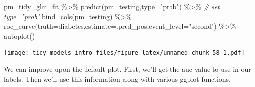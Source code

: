 \documentclass[
]{article}
\newenvironment{Shaded}{\begin{snugshade}}{\end{snugshade}}
\newcommand{\AttributeTok}[1]{\textcolor[rgb]{0.77,0.63,0.00}{#1}}
\newcommand{\CommentTok}[1]{\textcolor[rgb]{0.56,0.35,0.01}{\textit{#1}}}
\newcommand{\FunctionTok}[1]{\textcolor[rgb]{0.00,0.00,0.00}{#1}}
\newcommand{\NormalTok}[1]{#1}
\newcommand{\SpecialCharTok}[1]{\textcolor[rgb]{0.00,0.00,0.00}{#1}}
\newcommand{\StringTok}[1]{\textcolor[rgb]{0.31,0.60,0.02}{#1}}
\begin{document}
\begin{Shaded}
\begin{Highlighting}[]
\NormalTok{pm\_tidy\_glm\_fit }\SpecialCharTok{\%\textgreater{}\%}
  \FunctionTok{predict}\NormalTok{(pm\_testing,}\AttributeTok{type=}\StringTok{"prob"}\NormalTok{) }\SpecialCharTok{\%\textgreater{}\%}      \CommentTok{\# set type="prob"}
  \FunctionTok{bind\_cols}\NormalTok{(pm\_testing) }\SpecialCharTok{\%\textgreater{}\%}
  \FunctionTok{roc\_curve}\NormalTok{(}\AttributeTok{truth=}\NormalTok{diabetes,}\AttributeTok{estimate=}\NormalTok{.pred\_pos,}\AttributeTok{event\_level=}\StringTok{"second"}\NormalTok{) }\SpecialCharTok{\%\textgreater{}\%}
  \FunctionTok{autoplot}\NormalTok{()}
\end{Highlighting}
\end{Shaded}

\texttt{[image: tidy\_models\_intro\_files/figure-latex/unnamed-chunk-58-1.pdf]}

We can improve upon the default plot. First, we'll get the auc value to
use in our labels. Then we'll use this information along with various
ggplot functions.
\end{document}
